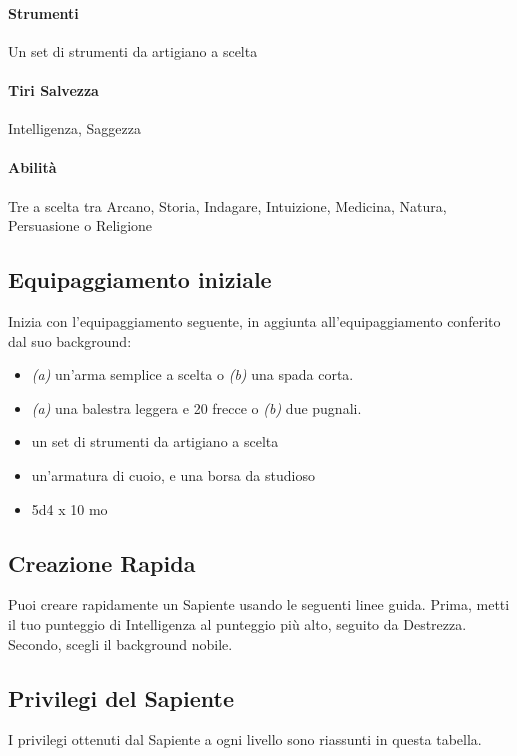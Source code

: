 \paragraph{Strumenti} Un set di strumenti da artigiano a scelta
\paragraph{Tiri Salvezza} Intelligenza, Saggezza
\paragraph{Abilità} Tre a scelta tra Arcano, Storia, Indagare, Intuizione,  Medicina, Natura, Persuasione o Religione

\subsection{Equipaggiamento iniziale}
Inizia con l'equipaggiamento seguente, in aggiunta all'equipaggiamento conferito dal suo background:
\begin{itemize}
    \item {\it(a)} un'arma semplice a scelta o {\it(b)} una spada corta.
    \item {\it(a)} una balestra leggera e 20 frecce o {\it(b)} due pugnali.
    \item un set di strumenti da artigiano a scelta
    \item un'armatura di cuoio, e una borsa da studioso
    \item 5d4 x 10 mo
\end{itemize}

\subsection{Creazione Rapida}
Puoi creare rapidamente un Sapiente usando le seguenti linee guida. Prima, metti il tuo punteggio di Intelligenza al punteggio più alto, seguito da Destrezza. Secondo, scegli il background nobile.

\subsection{Privilegi del Sapiente}
I privilegi ottenuti dal Sapiente a ogni livello sono riassunti in questa tabella.

